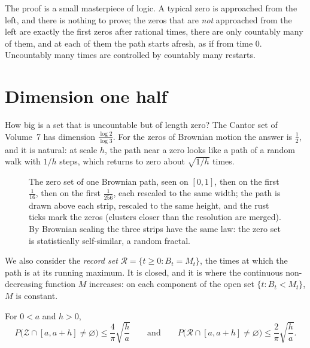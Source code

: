 \begin{beauty}
The proof is a small masterpiece of logic. A typical zero is approached from the left, and there is nothing to prove; the zeros that are \emph{not} approached from the left are exactly the
first zeros after rational times, there are only countably many of them, and at each of them the path starts afresh, as if from time $0$. Uncountably many times are controlled by
countably many restarts.
\end{beauty}

\section{Dimension one half}

How big is a set that is uncountable but of length zero? The Cantor set of Volume~7 has dimension $\frac{\log2}{\log3}$. For the zeros of Brownian motion the answer is $\frac12$, and it is
natural: at scale $h$, the path near a zero looks like a path of a random walk with $1/h$ steps, which returns to zero about $\sqrt{1/h}$ times.

\begin{figure}[ht]
\centering
{}
\caption{The zero set of one Brownian path, seen on $[0,1]$, then on the first $\frac1{16}$, then on the first $\frac1{256}$, each rescaled to the same width; the path is drawn above each strip, rescaled to the same height, and the rust ticks mark the zeros (clusters closer than the
resolution are merged). By Brownian scaling the three strips have the same law: the zero set is statistically self-similar, a random fractal.}
\label{fig:zeros}
\end{figure}

We also consider the \emph{record set} $\mathcal R=\{t\ge0:B_t=M_t\}$, the times at which the path is at its running maximum. It is closed, and it is where the continuous non-decreasing function $M$
increases: on each component of the open set $\{t:B_t<M_t\}$, $M$ is constant.

\begin{lemma}\label{lem:hitprob}
For $0<a$ and $h>0$,
\[
P\bigl(\mathcal Z\cap[a,a+h]\neq\varnothing\bigr)\le\frac4\pi\sqrt{\frac ha}\qquad\text{and}\qquad P\bigl(\mathcal R\cap[a,a+h]\neq\varnothing\bigr)\le\frac2\pi\sqrt{\frac ha}.
\]
\end{lemma}

